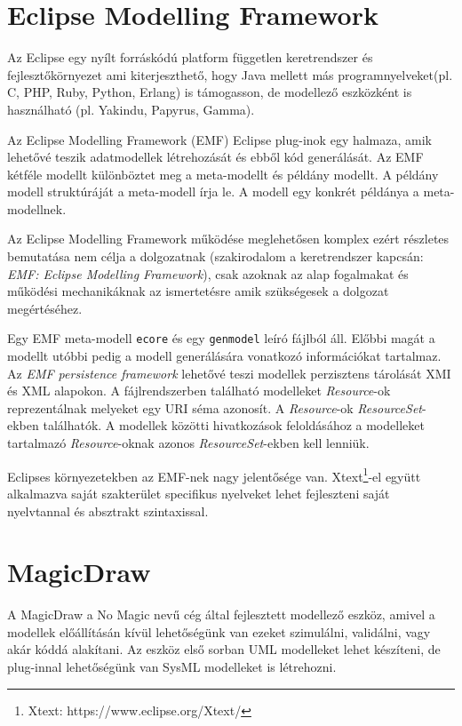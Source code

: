 \section{Eclipse Modelling Framework}
Az Eclipse egy nyílt forráskódú platform független keretrendszer és fejlesztőkörnyezet ami kiterjeszthető, hogy Java mellett más programnyelveket(pl. C, PHP, Ruby, Python, Erlang) is támogasson, de modellező eszközként is használható (pl. Yakindu, Papyrus, Gamma).

Az Eclipse Modelling Framework (EMF) Eclipse plug-inok egy halmaza, amik lehetővé teszik adatmodellek létrehozását és ebből kód generálását. Az EMF kétféle modellt különböztet meg a meta-modellt és példány modellt. A példány modell struktúráját a meta-modell írja le. A modell egy konkrét példánya a meta-modellnek.

Az Eclipse Modelling Framework  működése meglehetősen komplex ezért részletes bemutatása nem célja a dolgozatnak (szakirodalom a keretrendszer kapcsán: \emph{EMF: Eclipse Modelling Framework}\cite{steinberg2008emf}), csak azoknak az alap fogalmakat és működési mechanikáknak az ismertetésre amik szükségesek a dolgozat megértéséhez.

Egy EMF meta-modell \verb+ecore+ és egy \verb+genmodel+ leíró fájlból áll. Előbbi magát a modellt utóbbi pedig a modell generálására vonatkozó információkat tartalmaz. Az \emph{EMF persistence framework} lehetővé teszi modellek perzisztens tárolását XMI és XML alapokon. A fájlrendszerben található modelleket \emph{Resource}-ok reprezentálnak melyeket egy URI séma azonosít. A \emph{Resource}-ok \emph{ResourceSet}-ekben találhatók. A modellek közötti hivatkozások feloldásához a modelleket tartalmazó \emph{Resource}-oknak azonos \emph{ResourceSet}-ekben kell lenniük.

Eclipses környezetekben az EMF-nek nagy jelentősége van. Xtext\footnote{Xtext: https://www.eclipse.org/Xtext/}-el együtt alkalmazva saját szakterület specifikus nyelveket lehet fejleszteni saját nyelvtannal és absztrakt szintaxissal.

\section{MagicDraw}
A MagicDraw a No Magic \cite{NoMag} nevű cég által fejlesztett modellező eszköz, amivel a modellek előállításán kívül lehetőségünk van ezeket szimulálni, validálni, vagy akár kóddá alakítani. Az eszköz első sorban UML modelleket lehet készíteni, de plug-innal lehetőségünk van SysML \cite{SysML} modelleket is létrehozni.

